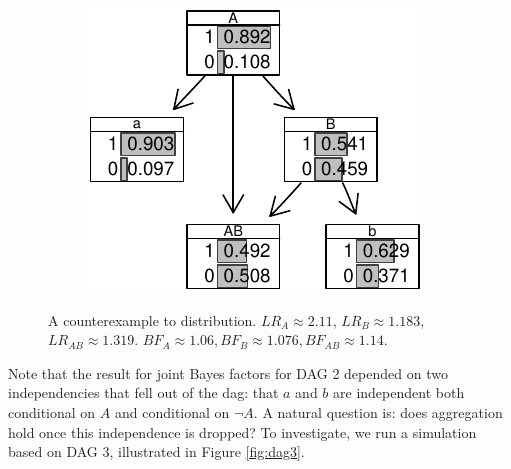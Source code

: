 \documentclass[
  10pt,
  dvipsnames,enabledeprecatedfontcommands]{scrartcl}
\newcommand{\n}{\neg}
\begin{document}
\begin{figure}
\begin{subfigure}[!ht]{0.45\textwidth}
\normalsize
\end{subfigure} \begin{subfigure}[!ht]{0.45\textwidth}

\begin{center}\includegraphics[width=1\linewidth]{conjunction-appendix13_files/figure-latex/unnamed-chunk-25-1} \end{center}
\end{subfigure}
\caption{A counterexample to distribution. $LR_A  \approx 2.11$, $LR_B \approx 1.183$,  $LR_{AB} \approx 1.319$. \newline  $BF_A \approx  1.06, BF_B \approx    1.076, BF_{AB}\approx   1.14$.}
\label{tab:CPTconjunctionBNL}
\end{figure}

Note that the result for joint Bayes factors for \textsf{DAG 2} depended
on two independencies that fell out of the dag: that \(a\) and \(b\) are
independent both conditional on \(A\) and conditional on \(\n A\). A
natural question is: does aggregation hold once this independence is
dropped? To investigate, we run a simulation based on \textsf{DAG 3},
illustrated in Figure \ref{fig:dag3}.

\vspace{1mm}
\footnotesize

\normalsize
\end{document}
